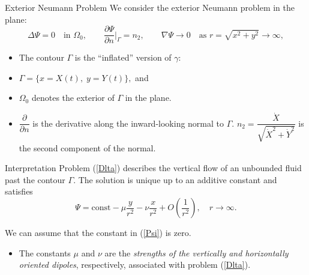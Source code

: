\documentclass{beamer}
\begin{document}
\begin{frame}{Exterior Neumann Problem}
We consider the exterior Neumann problem in the plane:
\begin{equation}\label{Dlta}
\Delta \Psi = 0 \quad \text{in } \Omega_0, \qquad  
\frac{\partial \Psi}{\partial n}\Big|_{\Gamma} = n_2, \qquad 
\nabla \Psi \to 0 \quad \text{as } r=\sqrt{x^2+y^2}\to\infty,
\end{equation}

\begin{itemize}
    \item The contour $\Gamma$ is the ``inflated'' version of $\gamma$:  \item
$\Gamma = \{x=X(t), \; y=Y(t)\}, $
    and \item 
$\Omega_0$ denotes the exterior of $\Gamma$ in the plane.
    
    \item $\dfrac{\partial}{\partial n}$ is the derivative along the inward-looking normal to $\Gamma$. $n_2 = \dfrac{\dot{X}}{\sqrt{\dot{X}^2 + \dot{Y}^2}}$ is the second component of the normal.
\end{itemize}
\end{frame} 

\begin{frame}
\begin{block}{Interpretation}
Problem (\ref{Dlta}) describes the vertical flow of an unbounded fluid past the contour $\Gamma$.  
The solution is unique up to an additive constant and satisfies
\begin{equation}\label{Psi}
\Psi = \text{const} - \mu \frac{y}{r^2} - \nu \frac{x}{r^2} 
       + O\!\left(\frac{1}{r^2}\right), \quad r\to\infty.
\end{equation}
\end{block}
We can assume that the constant in (\ref{Psi}) is zero.  

\medskip
\begin{itemize}
    \item The constants $\mu$ and $\nu$ are the \textit{strengths of the vertically and horizontally oriented dipoles}, respectively, associated with problem (\ref{Dlta}).
\end{itemize}
\end{frame}
\end{document}

